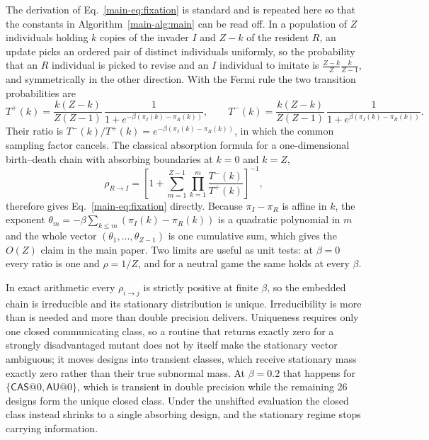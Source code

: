 \documentclass[a4paper,fleqn]{cas-sc}
\newcommand{\CAS}{\textsf{CAS}}
\newcommand{\AU}{\textsf{AU}}
\begin{document}
The derivation of Eq.~\eqref{main-eq:fixation} is standard and is repeated here so
that the constants in Algorithm~\ref{main-alg:main} can be read off. In a population
of $Z$ individuals holding $k$ copies of the invader $I$ and $Z-k$ of the
resident $R$, an update picks an ordered pair of distinct individuals uniformly,
so the probability that an $R$ individual is picked to revise and an $I$
individual to imitate is $\frac{Z-k}{Z}\frac{k}{Z-1}$, and symmetrically in the
other direction. With the Fermi rule the two transition probabilities are
\begin{equation}
  T^{+}(k) = \frac{k(Z-k)}{Z(Z-1)}\,
    \frac{1}{1+e^{-\beta(\pi_{I}(k)-\pi_{R}(k))}},
  \qquad
  T^{-}(k) = \frac{k(Z-k)}{Z(Z-1)}\,
    \frac{1}{1+e^{\beta(\pi_{I}(k)-\pi_{R}(k))}}.
  \label{eq:supp-rates}
\end{equation}
Their ratio is
$T^{-}(k)/T^{+}(k)=e^{-\beta(\pi_{I}(k)-\pi_{R}(k))}$, in which the common
sampling factor cancels. The classical absorption formula for a
one-dimensional birth--death chain with absorbing boundaries at $k=0$ and
$k=Z$,
\[
  \rho_{R\to I}
  = \left[1+\sum_{m=1}^{Z-1}\prod_{k=1}^{m}
    \frac{T^{-}(k)}{T^{+}(k)}\right]^{-1},
\]
therefore gives Eq.~\eqref{main-eq:fixation} directly. Because
$\pi_{I}-\pi_{R}$ is affine in $k$, the exponent
$\theta_{m}=-\beta\sum_{k\le m}(\pi_{I}(k)-\pi_{R}(k))$ is a quadratic
polynomial in $m$ and the whole vector
$(\theta_{1},\dots,\theta_{Z-1})$ is one cumulative sum, which gives the
$O(Z)$ claim in the main paper. Two limits are useful as unit tests: at
$\beta=0$ every ratio is one and $\rho=1/Z$, and for a neutral game the same
holds at every $\beta$.

In exact arithmetic every $\rho_{i\to j}$ is strictly positive at finite
$\beta$, so the embedded chain is irreducible and its stationary distribution
is unique. Irreducibility is more than is needed and more than double precision
delivers. Uniqueness requires only one closed communicating class, so a routine
that returns exactly zero for a strongly disadvantaged mutant does not by
itself make the stationary vector ambiguous; it moves designs into transient
classes, which receive stationary mass exactly zero rather than their true
subnormal mass. At $\beta=0.2$ that happens for
$\{\CAS{}@0,\AU{}@0\}$, which is transient in double precision while the
remaining 26 designs form the unique closed class. Under the unshifted
evaluation the closed class instead shrinks to a single absorbing design, and
the stationary regime stops carrying information.



\end{document}
